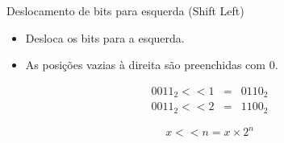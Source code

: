 

\begin{frame}{Deslocamento de bits para esquerda (Shift Left)}
    \begin{itemize}
        \item Desloca os bits para a esquerda.
        \item As posições vazias à direita são preenchidas com $0$.
    \end{itemize}

    \[
    \begin{array}{rcl}
        0011_{2} << 1 & = & 0110_{2} \\
        0011_{2} << 2 & = & 1100_{2}
    \end{array}
    \]

    \vspace{0.3cm}

    \[
        x << n = x \times 2^n
    \]

\end{frame}

